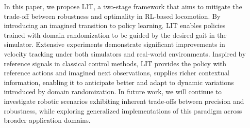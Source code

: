In this paper, we propose LIT, a two-stage framework that aims to mitigate the trade-off between robustness and optimality in RL-based locomotion. 
By introducing an imagined transition to policy learning, LIT enables policies trained with domain randomization to be guided by the desired gait in the simulator. 
Extensive experiments demonstrate significant improvements in velocity tracking under both simulators and real-world environments. 
Inspired by reference signals in classical control methods, LIT provides the policy with reference actions and imagined next observations, supplies richer contextual information, enabling it to anticipate better and adapt to dynamic variations introduced by domain randomization.
In future work, we will continue to investigate robotic scenarios exhibiting inherent trade-offs between precision and robustness, while exploring generalized implementations of this paradigm across broader application domains.